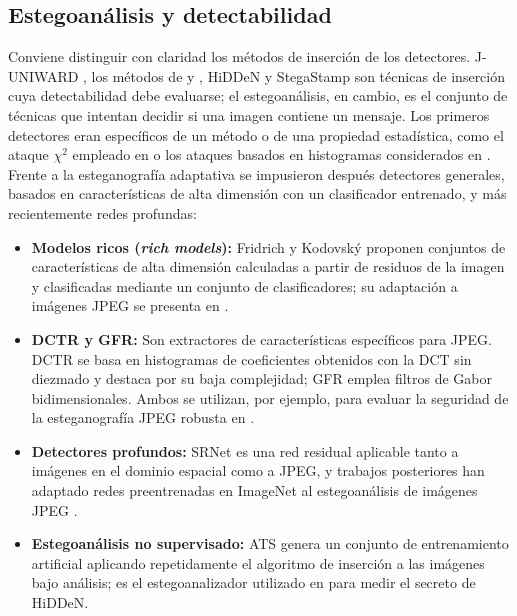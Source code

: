 \documentclass[IB]{TFUOC}%
\begin{document}
\subsection{Estegoanálisis y detectabilidad}
\label{subsec:estegoanalisis}

Conviene distinguir con claridad los métodos de inserción de los detectores. J-UNIWARD \cite{17}, los métodos de \cite{18} y \cite{20}, HiDDeN y StegaStamp son técnicas de inserción cuya detectabilidad debe evaluarse; el estegoanálisis, en cambio, es el conjunto de técnicas que intentan decidir si una imagen contiene un mensaje. Los primeros detectores eran específicos de un método o de una propiedad estadística, como el ataque $\chi^2$ empleado en \cite{13} o los ataques basados en histogramas considerados en \cite{15}. Frente a la esteganografía adaptativa se impusieron después detectores generales, basados en características de alta dimensión con un clasificador entrenado, y más recientemente redes profundas:

\begin{itemize}
    \item \textbf{Modelos ricos (\textit{rich models}):} Fridrich y Kodovský \cite{fridrich2012rich} proponen conjuntos de características de alta dimensión calculadas a partir de residuos de la imagen y clasificadas mediante un conjunto de clasificadores; su adaptación a imágenes JPEG se presenta en \cite{kodovsky2012jpegrich}.
    \item \textbf{DCTR y GFR:} Son extractores de características específicos para JPEG. DCTR \cite{holub2015dctr} se basa en histogramas de coeficientes obtenidos con la DCT sin diezmado y destaca por su baja complejidad; GFR \cite{song2015gfr} emplea filtros de Gabor bidimensionales. Ambos se utilizan, por ejemplo, para evaluar la seguridad de la esteganografía JPEG robusta en \cite{18}.
    \item \textbf{Detectores profundos:} SRNet \cite{boroumand2019srnet} es una red residual aplicable tanto a imágenes en el dominio espacial como a JPEG, y trabajos posteriores han adaptado redes preentrenadas en ImageNet al estegoanálisis de imágenes JPEG \cite{yousfi2020imagenet}.
    \item \textbf{Estegoanálisis no supervisado:} ATS \cite{lerch2016ats} genera un conjunto de entrenamiento artificial aplicando repetidamente el algoritmo de inserción a las imágenes bajo análisis; es el estegoanalizador utilizado en \cite{zhu2018hidden} para medir el secreto de HiDDeN.
\end{itemize}
\end{document}

